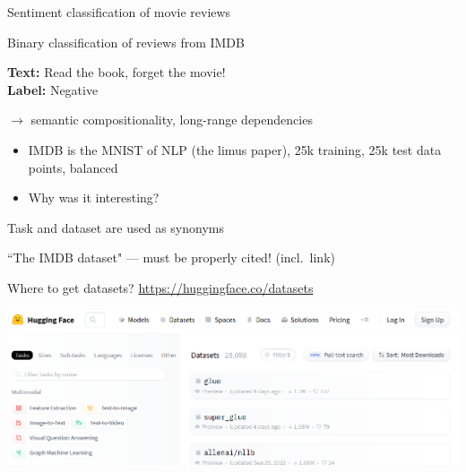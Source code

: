 \documentclass[12pt,aspectratio=169,handout]{beamer}
\begin{document}
\begin{frame}{ Sentiment classification of movie reviews}

Binary classification of reviews from IMDB

\begin{example}
	\textbf{Text:} Read the book, forget the movie! \\
	\textbf{Label:} Negative
\end{example}	

$\to$ semantic compositionality, long-range dependencies


\begin{itemize}
\item IMDB is the MNIST of NLP (the limus paper), 25k training, 25k test data points, balanced
\item Why was it interesting?
\end{itemize}

\end{frame}

\begin{frame}{ Task and dataset are used as synonyms}

``The IMDB dataset" --- must be properly cited! (incl.\ link)

\begin{block}{Where to get datasets?}
\url{https://huggingface.co/datasets}

\includegraphics[width=0.97\linewidth]{img/hfdata.png}
\end{block}

\end{frame}
\end{document}
